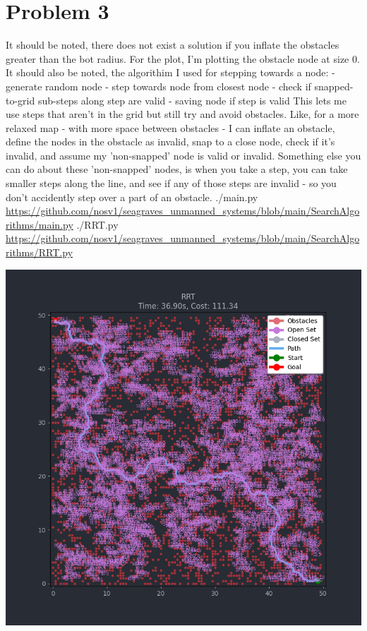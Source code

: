 \documentclass{article}
\begin{document}
        \section*{Problem 3}
            \begin{minipage}{\linewidth}
                \raggedright
                It should be noted, there does not exist a solution if you inflate the obstacles greater than the bot radius. For the plot, I'm plotting the obstacle node at size 0. \break
                \break
                It should also be noted, the algorithim I used for stepping towards a node: \break
                \break
                - generate random node \break
                - step towards node from closest node \break
                - check if snapped-to-grid sub-steps along step are valid \break
                - saving node if step is valid \break
                \break
                This lets me use steps that aren't in the grid but still try and avoid obstacles. Like, for a more relaxed map - with more space between obstacles - I can inflate an obstacle, define the nodes in the obstacle as invalid, snap to a close node, check if it's invalid, and assume my 'non-snapped' node is valid or invalid.\break
                \break
                Something else you can do about these 'non-snapped' nodes, is when you take a step, you can take smaller steps along the line, and see if any of those steps are invalid - so you don't accidently step over a part of an obstacle. \break
                \break
                ./main.py \break
                \url{https://github.com/nosv1/seagraves_unmanned_systems/blob/main/SearchAlgorithms/main.py} \break
                ./RRT.py \break
                \url{https://github.com/nosv1/seagraves_unmanned_systems/blob/main/SearchAlgorithms/RRT.py}
                \begin{center}
                    \includegraphics[width=\linewidth]{HW3P3 RRT.png}
                \end{center}
            \end{minipage}
\end{document}
